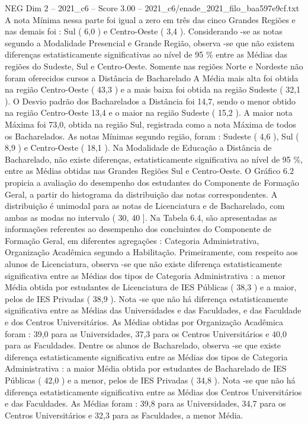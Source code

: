 \begin{textsample}{NEG Dim 2 – 2021\_c6 – Score 3.00 – 2021\_c6/enade\_2021\_filo\_baa597e9cf.txt}
A nota Mínima nessa parte foi igual a zero em três das cinco Grandes Regiões e nas demais foi : Sul ( 6,0 ) e Centro-Oeste ( 3,4 ).
Considerando -se as notas segundo a Modalidade Presencial e Grande Região, observa -se que não existem diferenças estatisticamente significativas ao nível de 95 \% entre as Médias das regiões do Sudeste, Sul e Centro-Oeste.
Somente nas regiões Norte e Nordeste não foram oferecidos cursos a Distância de Bacharelado A Média mais alta foi obtida na região Centro-Oeste ( 43,3 ) e a mais baixa foi obtida na região Sudeste ( 32,1 ).
O Desvio padrão dos Bacharelados a Distância foi 14,7, sendo o menor obtido na região Centro-Oeste 13,4 e o maior na região Sudeste ( 15,2 ).
A maior nota Máxima foi 73,0, obtida na região Sul, registrada como a nota Máxima de todos os Bacharelados.
As notas Mínimas segundo região, foram : Sudeste ( 4,6 ), Sul ( 8,9 ) e Centro-Oeste ( 18,1 ).
Na Modalidade de Educação a Distância de Bacharelado, não existe diferenças, estatisticamente significativa ao nível de 95 \%, entre as Médias obtidas nas Grandes Regiões Sul e Centro-Oeste.
O Gráfico 6.2 propicia a avaliação do desempenho dos estudantes do Componente de Formação Geral, a partir do histograma da distribuição das notas correspondentes.
A distribuição é unimodal para as notas de Licenciatura e de Bacharelado, com ambas as modas no intervalo ( 30, 40 ].
Na Tabela 6.4, são apresentadas as informações referentes ao desempenho dos concluintes do Componente de Formação Geral, em diferentes agregações : Categoria Administrativa, Organização Acadêmica segundo a Habilitação.
Primeiramente, com respeito aos alunos de Licenciatura, observa -se que não existe diferença estatisticamente significativa entre as Médias dos tipos de Categoria Administrativa : a menor Média obtida por estudantes de Licenciatura de IES Públicas ( 38,3 ) e a maior, pelos de IES Privadas ( 38,9 ).
Nota -se que não há diferença estatisticamente significativa entre as Médias das Universidades e das Faculdades, e das Faculdade e dos Centros Universitários.
As Médias obtidas por Organização Acadêmica foram : 39,0 para as Universidades, 37,3 para os Centros Universitários e 40,0 para as Faculdades.
Dentre os alunos de Bacharelado, observa -se que existe diferença estatisticamente significativa entre as Médias dos tipos de Categoria Administrativa : a maior Média obtida por estudantes de Bacharelado de IES Públicas ( 42,0 ) e a menor, pelos de IES Privadas ( 34,8 ).
Nota -se que não há diferença estatisticamente significativa entre as Médias dos Centros Universitários e das Faculdades.
As Médias foram : 39,8 para as Universidades, 34,7 para os Centros Universitários e 32,3 para as Faculdades, a menor Média.

\end{textsample}
